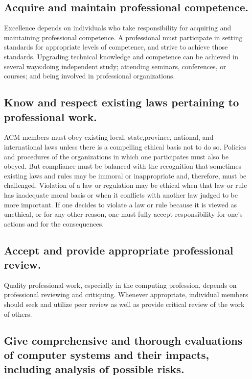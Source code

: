\documentclass{article}
\begin{document}
\subsection{Acquire and maintain professional competence.}

Excellence depends on individuals who take responsibility for acquiring and
maintaining professional competence. A professional must participate in setting
standards for appropriate levels of competence, and strive to achieve those
standards. Upgrading technical knowledge and competence can be achieved in
several ways:doing independent study; attending seminars, conferences, or
courses; and being involved in professional organizations.

\subsection{Know and respect existing laws pertaining to professional work.}

ACM members must obey existing local, state,province, national, and
international laws unless there is a compelling ethical basis not to do so.
Policies and procedures of the organizations in which one participates must
also be obeyed. But compliance must be balanced with the recognition that
sometimes existing laws and rules may be immoral or inappropriate and,
therefore, must be challenged. Violation of a law or regulation may be ethical
when that law or rule has inadequate moral basis or when it conflicts with
another law judged to be more important. If one decides to violate a law or
rule because it is viewed as unethical, or for any other reason, one must fully
accept responsibility for one's actions and for the consequences.

\subsection{Accept and provide appropriate professional review.}

Quality professional work, especially in the computing profession, depends on
professional reviewing and critiquing. Whenever appropriate, individual members
should seek and utilize peer review as well as provide critical review of the
work of others.

\subsection{Give comprehensive and thorough evaluations of computer systems and
their impacts, including analysis of possible risks.}
\end{document}
